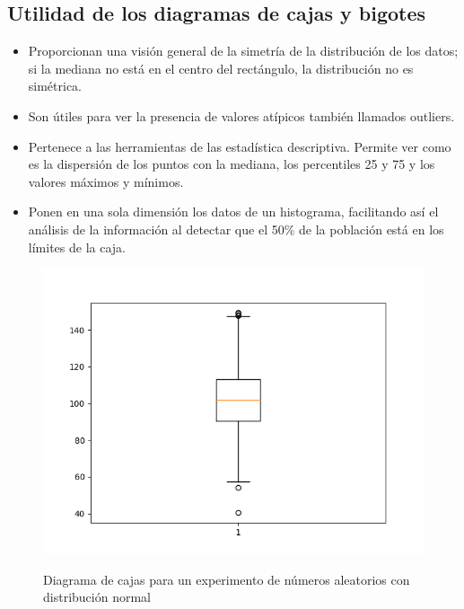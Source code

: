 \subsection{Utilidad de los diagramas de cajas y bigotes}

\begin{itemize}
\item Proporcionan una visión general de la simetría de la distribución de los
datos; si la mediana no está en el centro del rectángulo, la distribución no es
simétrica.

\item Son útiles para ver la presencia de valores atípicos también llamados
outliers.

\item Pertenece a las herramientas de las estadística descriptiva. Permite ver
como es la dispersión de los puntos con la mediana, los percentiles 25 y 75 y
los valores máximos y mínimos.

\item Ponen en una sola dimensión los datos de un histograma, facilitando así el
análisis de la información al detectar que el 50\% de la población está en los
límites de la caja.
\end{itemize}

\begin{figure}[h!]
    \includegraphics[scale=0.9]{figures/boxplot_test.png}
    \label{fig:boxplot}
    \caption{Diagrama de cajas para un experimento de números aleatorios con distribución normal}
\end{figure}
